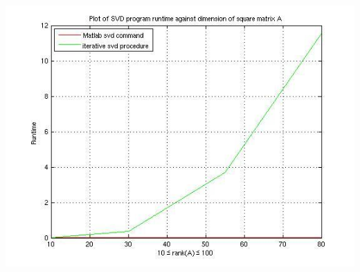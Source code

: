 \documentclass[10pt]{amsart}
\theoremstyle{remark}
\begin{document}
 \includegraphics{iterativeSVD.jpg}



\end{document}
